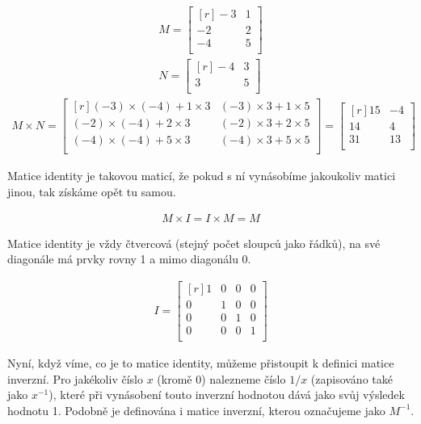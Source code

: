 \begin{align}
M = 
\begin{bmatrix*}[r]
  -3 & 1 \\
  -2 & 2 \\
  -4 & 5 \\
\end{bmatrix*} \\
N =
\begin{bmatrix*}[r]
  -4 & 3 \\
   3 & 5 \\
\end{bmatrix*}
\end{align} 
\begin{align}
M \times N = 
\begin{bmatrix*}[r]
  (-3) \times (-4) + 1 \times 3 & (-3) \times 3 + 1 \times 5 \\
  (-2) \times (-4) + 2 \times 3 & (-2) \times 3 + 2 \times 5 \\
  (-4) \times (-4) + 5 \times 3 & (-4) \times 3 + 5 \times 5 \\
\end{bmatrix*}
=
\begin{bmatrix*}[r]
  15 & -4 \\
  14 & 4 \\
  31 & 13 \\
\end{bmatrix*}
\end{align}


Matice identity je takovou maticí, že pokud s ní vynásobíme jakoukoliv matici jinou, tak získáme opět tu samou.

\begin{align}
M \times I = I \times M = M
\end{align}

Matice identity je vždy čtvercová (stejný počet sloupců jako řádků), na své diagonále má prvky rovny 1 a mimo diagonálu 0.

\begin{align}
I = 
\begin{bmatrix*}[r]
  1 & 0 & 0 & 0 \\
  0 & 1 & 0 & 0 \\
  0 & 0 & 1 & 0 \\
  0 & 0 & 0 & 1 \\
\end{bmatrix*}
\end{align}

Nyní, když víme, co je to matice identity, můžeme přistoupit k definici matice inverzní. Pro jakékoliv číslo $x$ (kromě 0) nalezneme číslo $1/x$ (zapisováno také jako $x^{-1}$), které při vynásobení touto inverzní hodnotou dává jako svůj výsledek hodnotu 1. Podobně je definována i matice inverzní, kterou označujeme jako $M^{-1}$.

